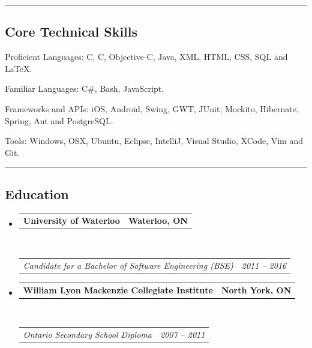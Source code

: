 \documentclass[10pt,letterpaper]{article}
\makeatletter
\newenvironment{indentsection}[1]%
{\begin{list}{}%
	{\setlength{\leftmargin}{#1}}%
	\item[]%
}
{\end{list}}
\newcommand{\headerrow}[2]
{\begin{tabular*}{\linewidth}{l@{\extracolsep{\fill}}r}
	#1 &
	#2 \\
\end{tabular*}}
\newcommand{\CPP}
{C\nolinebreak[4]\hspace{-.05em}\raisebox{.22ex}{\footnotesize\bf ++}}
\makeatother
\begin{document}
\hrule
\vspace{-0.4em}
\subsection*{Core Technical Skills}

\begin{indentsection}{\parindent}
\begin{description*}
	\item[Proficient Languages:]
	C, \CPP, Objective-C, Java, XML, HTML, CSS, SQL and \LaTeX.
	\item[Familiar Languages:]
	C\#, Bash, JavaScript.
	\item[Frameworks and APIs:]
	iOS, Android, Swing, GWT, JUnit, Mockito, Hibernate, Spring, Ant and PostgreSQL.
	\item[Tools:]
	Windows, OSX, Ubuntu, Eclipse, IntelliJ, Visual Studio, XCode, Vim and Git.
\end{description*}
\end{indentsection}

\hrule
\vspace{-0.4em}
\subsection*{Education}

\begin{itemize}
	\parskip=0.1em

	\item 
	\headerrow
		{\textbf{University of Waterloo}}
		{\textbf{Waterloo, ON}}
	\\
	\headerrow
		{\emph{Candidate for a Bachelor of Software Engineering (BSE)}}
		{\emph{2011 -- 2016}}
		
	\item 
	\headerrow
		{\textbf{William Lyon Mackenzie Collegiate Institute}}
		{\textbf{North York, ON}}
	\\
	\headerrow
		{\emph{Ontario Secondary School Diploma}}
		{\emph{2007 -- 2011}}

\end{itemize}
\end{document}
